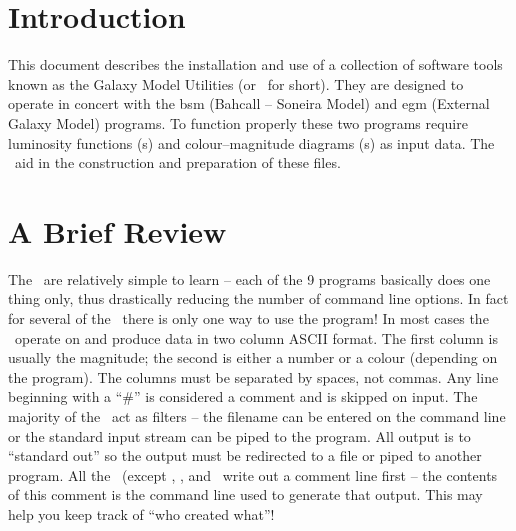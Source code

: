 \documentclass[11pt,twoside]{article}
\begin{document}

\newpage
\setcounter{page}{1}
\section{Introduction}

This document describes the installation and use of a collection of software
tools known as the Galaxy Model Utilities (or \gmu\ for short). They are 
designed to operate in concert with the {\sc bsm} (Bahcall -- Soneira Model)
and {\sc egm} (External Galaxy Model) programs. To function properly these 
two programs require luminosity functions (\lf s) and colour--magnitude
diagrams (\cmd s) as input data. The \gmu\ aid in the construction and 
preparation of these files.


\section{A Brief Review}

The \gmu\ are relatively simple to learn -- each of the 9 programs basically
does one thing only, thus drastically reducing the number of command line 
options. In fact for several of the \gmu\ there is only one way to use the
program! In most cases the \gmu\ operate on and produce data in two column 
ASCII format. The first column is usually the magnitude; the second is either 
a number or a colour (depending on the program). The columns must be separated 
by spaces, not commas. Any line beginning with a ``\#'' is considered a comment
and is skipped on input. The majority of the \gmu\ act as filters -- the 
filename can be entered on the command line or the standard input stream can be
piped to the program. All output is to ``standard out'' so the output must 
be redirected to a file or piped to another program. All the \gmu\ (except
\mkspl , \addegm , and \egmcmp\ write out a comment line first -- the contents
of this comment is the command line used to generate that output. This may help
you keep track of ``who created what''!
\end{document}
